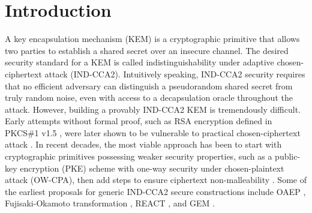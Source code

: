 \documentclass[journal=tches,submission]{iacrtrans}
\begin{document}


\section{Introduction}\label{sec:introduction}
A key encapsulation mechanism (KEM) \cite{DBLP:journals/iacr/Shoup01} is a cryptographic primitive that allows two parties to establish a shared secret over an insecure channel. The desired security standard for a KEM is called indistinguishability under adaptive chosen-ciphertext attack (IND-CCA2). Intuitively speaking, IND-CCA2 security requires that no efficient adversary can distinguish a pseudorandom shared secret from truly random noise, even with access to a decapsulation oracle throughout the attack. However, building a provably IND-CCA2 KEM is tremendously difficult. Early attempts without formal proof, such as RSA encryption defined in PKCS\#1 v1.5 \cite{DBLP:journals/rfc/rfc2313}, were later shown to be vulnerable to practical chosen-ciphertext attack \cite{DBLP:conf/crypto/Bleichenbacher98}. In recent decades, the most viable approach has been to start with cryptographic primitives possessing weaker security properties, such as a public-key encryption (PKE) scheme with one-way security under chosen-plaintext attack (OW-CPA), then add steps to ensure ciphertext non-malleability \cite{DBLP:conf/asiacrypt/BellareN00}. Some of the earliest proposals for generic IND-CCA2 secure constructions include OAEP \cite{DBLP:conf/eurocrypt/BellareR94}, Fujisaki-Okamoto transformation \cite{DBLP:conf/crypto/FujisakiO99}\cite{DBLP:journals/joc/FujisakiO13}, REACT \cite{DBLP:conf/ctrsa/OkamotoP01}, and GEM \cite{DBLP:conf/ctrsa/CoronHJPPT02}.
\end{document}
